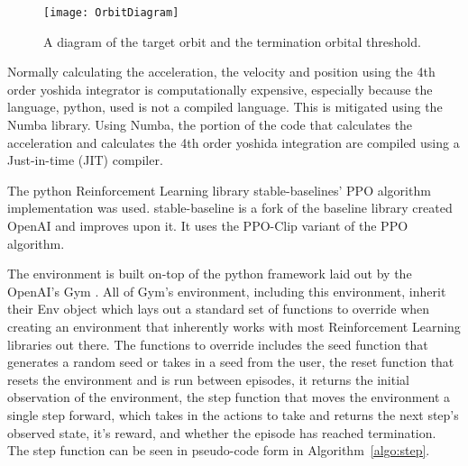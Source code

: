 \begin{figure}
	\centering
	\texttt{[image: OrbitDiagram]}
	\caption{A diagram of the target orbit and the termination orbital threshold.}
	\label{fig:OrbitDiagram}
\end{figure}

Normally calculating the acceleration, the velocity and position using the 4th order yoshida integrator is computationally expensive, especially because the language, python, used is not a compiled language. This is mitigated using the Numba \cite{10.1145/2833157.2833162} library. Using Numba, the portion of the code that calculates the acceleration and calculates the 4th order yoshida integration are compiled using a Just-in-time (JIT) compiler.

The python Reinforcement Learning library stable-baselines' PPO algorithm implementation was used. stable-baseline is a fork of the baseline library created OpenAI and improves upon it. It uses the PPO-Clip variant of the PPO algorithm.

The environment is built on-top of the python framework laid out by the OpenAI's Gym \cite{DBLP:journals/corr/BrockmanCPSSTZ16}. All of Gym's environment, including this environment, inherit their Env object which lays out a standard set of functions to override when creating an environment that inherently works with most Reinforcement Learning libraries out there. The functions to override includes the seed function that generates a random seed or takes in a seed from the user, the reset function that resets the environment and is run between episodes, it returns the initial observation of the environment, the step function that moves the environment a single step forward, which takes in the actions to take and returns the next step's observed state, it's reward, and whether the episode has reached termination. The step function can be seen in pseudo-code form in Algorithm~\ref{algo:step}.

